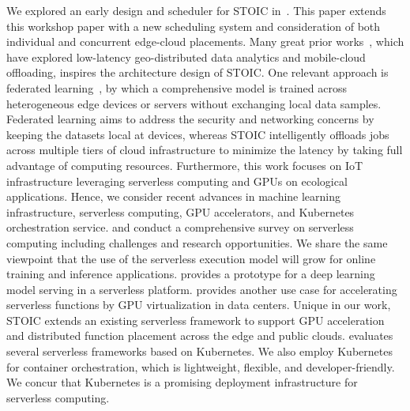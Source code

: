 We explored an early design and scheduler for STOIC in~\cite{ref:stoic2020}.  This paper extends this workshop paper with a new scheduling system and consideration of both individual and concurrent edge-cloud placements. Many great prior works~\cite{ref:lowlatency, ref:bandwidth, ref:MAUI}, which have explored low-latency geo-distributed data analytics and mobile-cloud offloading, inspires the architecture design of STOIC. One relevant approach is federated learning~\cite{ref:federated}, by which a comprehensive model is trained across heterogeneous edge devices or servers without exchanging local data samples. Federated learning aims to address the security and networking concerns by keeping the datasets local at devices, whereas STOIC intelligently offloads jobs across multiple tiers of cloud infrastructure to minimize the latency by taking full advantage of computing resources. Furthermore, this work focuses on IoT infrastructure leveraging serverless computing and GPUs on ecological applications. Hence, we consider recent advances in machine learning infrastructure, serverless computing, GPU accelerators, and Kubernetes orchestration service. \cite{ref:serverlessstep} and \cite{ref:berkeleyserverless} conduct a comprehensive survey on serverless computing including challenges and research opportunities. We share the same viewpoint that the use of the serverless execution model will grow for online training and inference applications. \cite{ref:deepserving} provides a prototype for a deep learning model serving in a serverless platform. \cite{ref:accelerated} provides another use case for accelerating serverless functions by GPU virtualization in data centers. Unique in our work, STOIC extends an existing serverless framework to support GPU acceleration and distributed function placement across the edge and public clouds. \cite{ref:evaluation} evaluates several serverless frameworks based on Kubernetes. We also employ Kubernetes for container orchestration, which is lightweight, flexible, and developer-friendly.  We concur that Kubernetes is a promising deployment infrastructure for serverless computing.  

